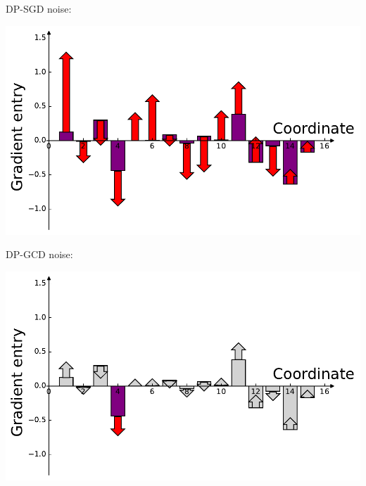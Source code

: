 \documentclass[17pt,aspectratio=169]{beamer}
\begin{document}
\begin{frame}
  \begin{minipage}{0.5\linewidth}
    DP-SGD noise:
    \begin{center}
      \includegraphics[width=0.9\linewidth]{img/normal_grad.pdf}%
    \end{center}
  \end{minipage}%
  \begin{minipage}{0.5\linewidth}
        DP-GCD noise:
        \begin{center}
          \includegraphics[width=0.9\linewidth]{img/normal_grad_greedy.pdf}
        \end{center}
  \end{minipage}
\end{frame}
\end{document}
